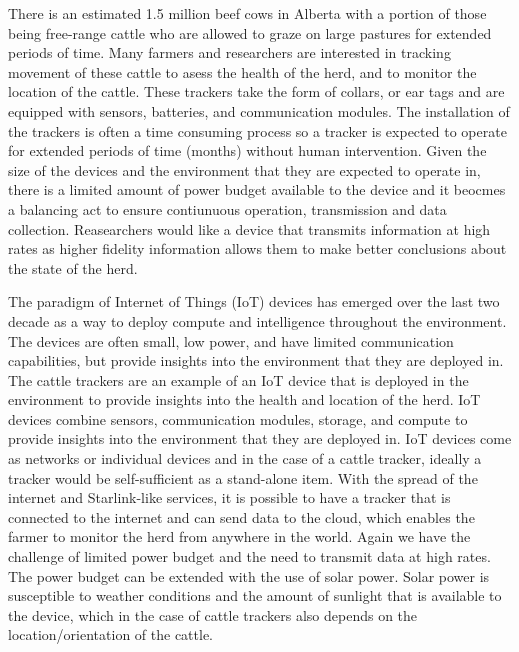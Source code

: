 \documentclass[10pt]{cai}
\begin{document}
There is an estimated 1.5 million beef cows in Alberta with a portion of those being free-range cattle who are allowed to graze on large pastures for extended periods of time.
Many farmers and researchers are interested in tracking movement of these cattle to asess the health of the herd, and to monitor the location of the cattle.
These trackers take the form of collars, or ear tags and are equipped with sensors, batteries, and communication modules.
The installation of the trackers is often a time consuming process so a tracker is expected to operate for extended periods of time (months) without human intervention.
Given the size of the devices and the environment that they are expected to operate in, there is a limited amount of power budget available to the device and it beocmes a balancing act to ensure contiunuous operation, transmission and data collection.
Reasearchers would like a device that transmits information at high rates as higher fidelity information allows them to make better conclusions about the state of the herd.

The paradigm of Internet of Things (IoT) devices has emerged over the last two decade as a way to deploy compute and intelligence throughout the environment.
The devices are often small, low power, and have limited communication capabilities, but provide insights into the environment that they are deployed in.
The cattle trackers are an example of an IoT device that is deployed in the environment to provide insights into the health and location of the herd.
IoT devices combine sensors, communication modules, storage, and compute to provide insights into the environment that they are deployed in.
IoT devices come as networks or individual devices and in the case of a cattle tracker, ideally a tracker would be self-sufficient as a stand-alone item.
With the spread of the internet and Starlink-like services, it is possible to have a tracker that is connected to the internet and can send data to the cloud, which enables the farmer to monitor the herd from anywhere in the world.
Again we have the challenge of limited power budget and the need to transmit data at high rates.
The power budget can be extended with the use of solar power. 
Solar power is susceptible to weather conditions and the amount of sunlight that is available to the device, which in the case of cattle trackers also depends on the location/orientation of the cattle.
\end{document}
